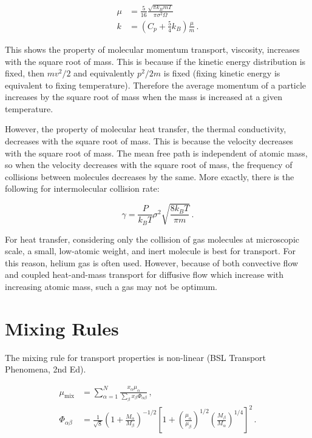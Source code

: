 \documentclass{article}
\begin{document}
\begin{align}
\mu &= \frac{5}{16} \frac{\sqrt{\pi k_B m T}}{\pi \sigma^2 \Omega} \tag{BSL 1.4-14}\,\\
k &= (C_p + \frac 54  k_B )  \frac{\mu}{m} \tag{BSL 9.3-15} \label{eqn:kpoly}\,.
\end{align}

This shows the property of molecular momentum transport, viscosity,
increases with the square root of mass. This is because if the
kinetic energy distribution is fixed, then $mv^2/2$ and equivalently
$p^2/2m$ is fixed (fixing kinetic energy is equivalent to fixing
temperature). Therefore the average momentum of a particle increases
by the square root of mass when the mass is increased at a given
temperature.

However, the property of molecular heat transfer, the thermal
conductivity, decreases with the square root of mass. This is because
the velocity decreases with the square root of mass. The mean free path
is independent of atomic mass, so when the velocity decreases with the
square root of mass, the frequency of collisions between molecules
decreases by the same. More exactly, there is the following for
intermolecular collision rate:

\begin{equation}
\gamma = \frac{P}{k_B T} \sigma^2 \sqrt{\frac{8 k_B T}{\pi m}} \,.
\end{equation}


For heat transfer, considering only the collision of gas molecules at
microscopic scale, a small, low-atomic weight, and inert molecule is
best for transport. For this reason, helium gas is often used. However,
because of both convective flow and coupled heat-and-mass transport for
diffusive flow which increase with increasing atomic mass, such a gas
may not be optimum.

\section{Mixing Rules}

The mixing rule for transport properties is non-linear (BSL Transport
Phenomena, 2nd Ed).  

\begin{align}
\mu_\text{mix} &= \sum_{\alpha=1}^N \frac{x_\alpha \mu_\alpha}{\sum_\beta x_\beta \Phi_{\alpha\beta}}\,, \tag{BSL 1.4-15}\\
\Phi_{\alpha\beta} &= \frac{1}{\sqrt{8}} \left(1 + \frac{M_\alpha}{M_\beta}\right)^{-1/2}
\left[1 + \left(\frac{\mu_\alpha}{\mu_\beta}\right)^{1/2}\left(\frac{M_\beta}{M_\alpha}\right)^{1/4}\right]^2 \,.\tag*{}
\end{align}
\end{document}
